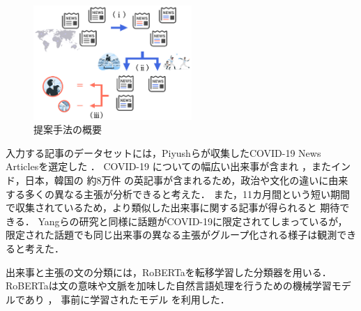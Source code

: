 \documentclass[a4paper, twocolumn, 10pt]{jarticle}
\makeatletter
\def\subsection{%
	\@startsection{subsection}{1}{\z@}%
	{.1\Cvs \@plus.1\Cdp \@minus.1\Cdp}%
	{.1\Cvs \@plus.1\Cdp}%
	{\normalfont\normalsize\bfseries}%
}
\makeatother
\begin{document}
\begin{figure}[H]
	\centering
	\includegraphics[keepaspectratio, width=60mm]{img/system_abstract.png}
	\caption{
    提案手法の概要
  }
	\label{system_abstract}
\end{figure}

入力する記事のデータセットには，Piyushらが収集したCOVID-19 News Articlesを選定した
．
COVID-19
についての幅広い出来事が含まれ
，またインド，日本，韓国の
約8万件
の英記事が含まれるため，政治や文化の違いに由来する多くの異なる主張が分析できると考えた．
また，11カ月間という短い期間で収集されているため，より類似した出来事に関する記事が得られると
期待できる．
Yangらの研究と同様に話題がCOVID-19に限定されてしまっているが，限定された話題でも同じ出来事の異なる主張がグループ化される様子は観測できると考えた．

出来事と主張の文の分類には，RoBERTaを転移学習した分類器を用いる．
RoBERTaは文の意味や文脈を加味した自然言語処理を行うための機械学習モデルであり
，
事前に学習されたモデル
を利用した．
\end{document}
